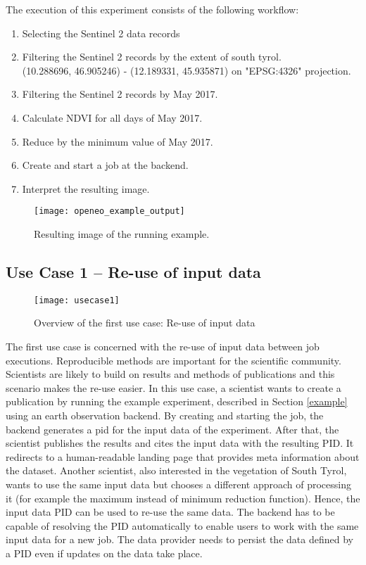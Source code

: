 \documentclass[draft,final]{vutinfth} %
\begin{document}
The execution of this experiment consists of the following workflow:

\begin{enumerate}
	\item Selecting the Sentinel 2 data records
	\item Filtering the Sentinel 2 records by the extent of south tyrol. \\(10.288696, 46.905246) - (12.189331, 45.935871) on "EPSG:4326" projection.
	\item Filtering the Sentinel 2 records by May 2017.
	\item Calculate NDVI for all days of May 2017.
	\item Reduce by the minimum value of May 2017.
	\item Create and start a job at the backend. 
	\item Interpret the resulting image.
\end{enumerate}

\begin{figure}[h]
	\centering
	\texttt{[image: openeo\_example\_output]}
	\caption{Resulting image of the running example.}
	\label{fig:example} %
\end{figure}


\subsection{Use Case 1 – Re-use of input data}\label{UseCase1}
\begin{figure}[h]
	\centering
	\texttt{[image: usecase1]}
	\caption{Overview of the first use case: Re-use of input data}
	\label{fig:usecase1} %
\end{figure}
The first use case is concerned with the re-use of input data between job executions. Reproducible methods are important for the scientific community. Scientists are likely to build on results and methods of publications and this scenario makes the re-use easier. In this use case, a scientist wants to create a publication by running the example experiment, described in Section \ref{example} using an earth observation backend. By creating and starting the job, the backend generates a \gls{pid} for the input data of the experiment. After that, the scientist publishes the results and cites the input data with the resulting PID. It redirects to a human-readable landing page that provides meta information about the dataset. Another scientist, also interested in the vegetation of South Tyrol, wants to use the same input data but chooses a different approach of processing it (for example the maximum instead of minimum reduction function). Hence, the input data PID can be used to re-use the same data. The backend has to be capable of resolving the PID automatically to enable users to work with the same input data for a new job. The data provider needs to persist the data defined by a PID even if updates on the data take place.   
\end{document}

